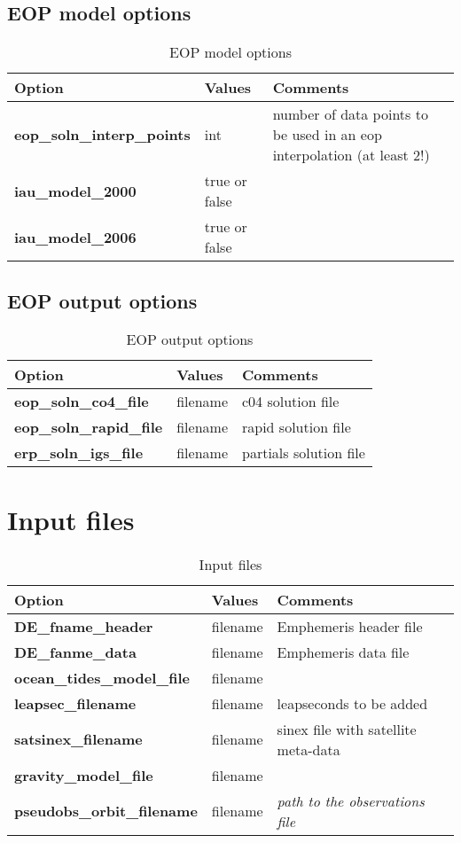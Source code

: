 \subsection{EOP model options}
\begin{table}[h!]
	\begin{tabular}{|p{2.5cm}|p{2.5cm}|p{5cm}|}
		\hline
		Option & Values & Comments \\
		\hline
        \textbf{eop\_soln\_interp\_points} & int & number of data points to be used in an eop interpolation (at least 2!)\\
        \textbf{iau\_model\_2000} & true or false & \\
        \textbf{iau\_model\_2006} & true or false & \\
		\hline
	\end{tabular}
	\caption{EOP model options}
	\label{table:yaml}
\end{table}

\subsection{EOP output options}
\begin{table}[h!]
	\begin{tabular}{|p{2.5cm}|p{2.5cm}|p{5cm}|}
		\hline
		Option & Values & Comments \\
		\hline
        \textbf{eop\_soln\_co4\_file} & filename & c04 solution file\\
        \textbf{eop\_soln\_rapid\_file} & filename & rapid solution file\\
        \textbf{erp\_soln\_igs\_file} & filename & partials solution file\\
		\hline
	\end{tabular}
	\caption{EOP output options}
	\label{table:yaml}
\end{table}

\section{Input files}
\begin{table}[h!]
	\begin{tabular}{|p{2.5cm}|p{2.5cm}|p{5cm}|}
		\hline
		Option & Values & Comments \\
		\hline
        \textbf{DE\_fname\_header} & filename &  Emphemeris header file \\
        \textbf{DE\_fanme\_data} & filename & Emphemeris data file \\
        \textbf{ocean\_tides\_model\_file} & filename & \\
        \textbf{leapsec\_filename} & filename & leapseconds to be added\\
        \textbf{satsinex\_filename} & filename & sinex file with satellite meta-data\\
        \textbf{gravity\_model\_file} & filename & \\
        \textbf{pseudobs\_orbit\_filename} & filename & \emph{path to the observations file}\\
		\hline
	\end{tabular}
	\caption{Input files}
	\label{table:label_name}
\end{table}

